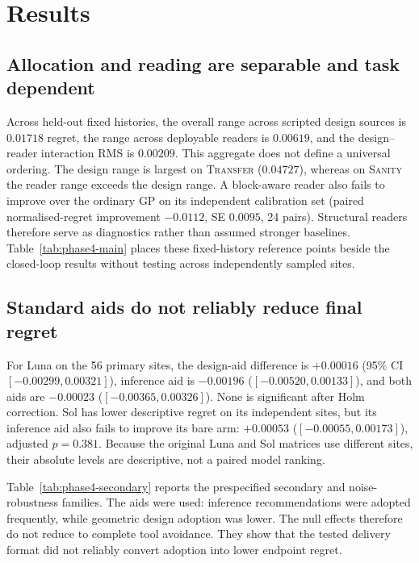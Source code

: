\section{Results}
\label{sec:results}

\subsection{Allocation and reading are separable and task dependent}
Across held-out fixed histories, the overall range across scripted design sources is
$0.01718$ regret, the range across deployable readers is $0.00619$, and the design--reader
interaction RMS is $0.00209$. This aggregate does not define a universal ordering. The
design range is largest on \textsc{Transfer} ($0.04727$), whereas on \textsc{Sanity} the
reader range exceeds the design range. A block-aware reader also fails to improve over the
ordinary GP on its independent calibration set (paired normalised-regret improvement
$-0.0112$, SE $0.0095$, 24 pairs). Structural readers therefore serve as diagnostics rather than assumed stronger baselines. Table~\ref{tab:phase4-main} places these fixed-history reference points beside the closed-loop results without testing across independently sampled sites.



\subsection{Standard aids do not reliably reduce final regret}
For Luna on the 56 primary sites, the design-aid difference is $+0.00016$ (95\% CI
$[-0.00299,0.00321]$), inference aid is $-0.00196$ ($[-0.00520,0.00133]$), and both aids
are $-0.00023$ ($[-0.00365,0.00326]$). None is significant after Holm correction. Sol has
lower descriptive regret on its independent sites, but its inference aid also fails to
improve its bare arm: $+0.00053$ ($[-0.00055,0.00173]$), adjusted $p=0.381$. Because the
original Luna and Sol matrices use different sites, their absolute levels are descriptive,
not a paired model ranking.

Table~\ref{tab:phase4-secondary} reports the prespecified secondary and noise-robustness families. The aids were used: inference recommendations were adopted frequently, while geometric design adoption was lower. The null effects therefore do not reduce to complete tool
avoidance. They show that the tested delivery format did not reliably convert adoption into
lower endpoint regret.

